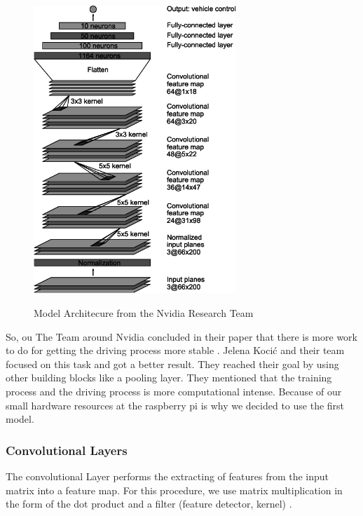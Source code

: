 \documentclass[journal]{IEEEtran}
\begin{document}
\begin{figure}
  \begin{center}
  \includegraphics[width=3in]{photo/CNNArchitecture.png}\\
  \caption{Model Architecure from the Nvidia Research Team \cite{LearningForSelf-DrivingCars}}\label{featuremap}
  \label{fig:Archi}
  \end{center}
\end{figure}

So, ou
The Team around Nvidia concluded in their paper that there is more work to do for getting the driving process more stable \cite{LearningForSelf-DrivingCars}. Jelena Kocić and their team focused on this task and got a better result. They reached their goal by using other building blocks like a pooling layer. They mentioned that the training process and the driving process is more computational intense. Because of our small hardware resources at the raspberry pi is why we decided to use the first model. \cite{AutomotivePlatformsAutonomousDriving}
\subsubsection{Convolutional Layers}
\noindent The convolutional Layer performs the extracting of features from the input matrix into a feature map. For this procedure, we use matrix multiplication in the form of the dot product and a filter (feature detector, kernel) \cite{Goodfellow-et-al-2016}. 
\end{document}
